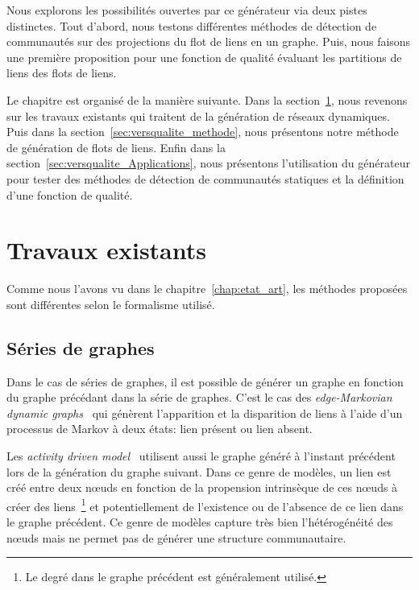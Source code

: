 \bigskip
Nous explorons les possibilités ouvertes par ce générateur via deux pistes distinctes.
Tout d'abord, nous testons différentes méthodes de détection de communautés sur des projections du flot de liens en un graphe.
Puis, nous faisons une première proposition pour une fonction de qualité évaluant les partitions de liens des flots de liens.

\bigskip

Le chapitre est organisé de la manière suivante.
Dans la section~\ref{sec:versqualite_existant}, nous revenons sur les travaux existants qui traitent de la génération de réseaux dynamiques.
Puis dans la section~\ref{sec:versqualite_methode}, nous présentons notre méthode de génération de flots de liens.
Enfin dans la section~\ref{sec:versqualite_Applications}, nous présentons l'utilisation du générateur pour tester des méthodes de détection de communautés statiques et la définition d'une fonction de qualité.

\section{Travaux existants}
\label{sec:versqualite_existant}

Comme nous l'avons vu dans le chapitre~\ref{chap:etat_art}, les méthodes proposées sont différentes selon le formalisme utilisé.

\subsection{Séries de graphes}
Dans le cas de séries de graphes, il est possible de générer un graphe en fonction du graphe précédant dans la série de graphes.
C'est le cas des \emph{edge-Markovian dynamic graphs}~\cite{Clementi2008} qui génèrent l'apparition et la disparition de liens à l'aide d'un processus de Markov à deux états: lien présent ou lien absent.

Les \emph{activity driven model}~\cite{Perra2012,Laurent2015a,Moinet2015} utilisent aussi le graphe généré à l'instant précédent lors de la génération du graphe suivant.
Dans ce genre de modèles, un lien est créé entre deux n\oe{}uds en fonction de la propension intrinsèque de ces n\oe{}uds à créer des liens~\footnote{Le degré dans le graphe précédent est généralement utilisé.} et potentiellement de l'existence ou de l'absence de ce lien dans le graphe précédent.
Ce genre de modèles capture très bien l'hétérogénéité des n\oe{}uds mais ne permet pas de générer une structure communautaire.


